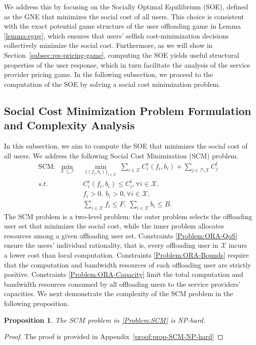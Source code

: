\documentclass[lettersize,journal]{IEEEtran}
\newtheorem{proposition}{Proposition}
\begin{document}
We address this by focusing on the Socially Optimal Equilibrium (SOE), defined as the GNE that minimizes the social cost of all users. This choice is consistent with the exact potential game structure of the user offloading game in Lemma \ref{lemma:egpg}, which ensures that users' selfish cost-minimization decisions collectively minimize the social cost. Furthermore, as we will show in Section~\ref{subsec:res-pricing-game}, computing the SOE yields useful structural properties of the user response, which in turn facilitate the analysis of the service provider pricing game. In the following subsection, we proceed to the computation of the SOE by solving a social cost minimization problem.

\subsection{Social Cost Minimization Problem Formulation and Complexity Analysis}\label{Subsection:Socially-Optimal-Equilibrium}
In this subsection, we aim to compute the SOE that minimizes the social cost of all users. We address the following Social Cost Minimization (SCM) problem.
\begin{subequations}\label{Problem:SCM}
\begin{align}
    \text{SCM}:\;\min_{\mathcal{X}\subseteq\mathcal{I}}\ &\min_{\{(f_i,b_i)\}_{i\in\mathcal{X}}}\ \sum_{i\in\mathcal{X}}C^e_i(f_i,b_i)+\sum_{j\in\mathcal{I}\setminus\mathcal{X}}C^l_j\\
            s.t.\quad &C^e_i(f_i,b_i)\le C^l_i, \forall i\in\mathcal{X},\label{Problem:ORA-QoS}\\
            &f_i> 0,\ b_i> 0, \forall i\in\mathcal{X},\label{Problem:ORA-Bounds}\\
            &\sum_{i\in\mathcal{X}}f_i\le F,\ \sum_{i\in\mathcal{X}}b_i\le B.\label{Problem:ORA-Capacity}
\end{align}
\end{subequations}
The SCM problem is a two-level problem: the outer problem selects the offloading user set that minimizes the social cost, while the inner problem allocates resources among a given offloading user set. Constraints \eqref{Problem:ORA-QoS} ensure the users' individual rationality, that is, every offloading user in $\mathcal{X}$ incurs a lower cost than local computation. Constraints \eqref{Problem:ORA-Bounds} require that the computation and bandwidth resources of each offloading user are strictly positive. Constraints \eqref{Problem:ORA-Capacity} limit the total computation and bandwidth resources consumed by all offloading users to the service providers’ capacities. We next demonstrate the complexity of the SCM problem in the following proposition.
\begin{proposition}\label{Proposition:SCM-NP-hardness}
The \( SCM \) problem in \eqref{Problem:SCM} is NP-hard.
\end{proposition}
\begin{proof}
    The proof is provided in Appendix~\ref{proof:prop-SCM-NP-hard}
\end{proof}
\end{document}
